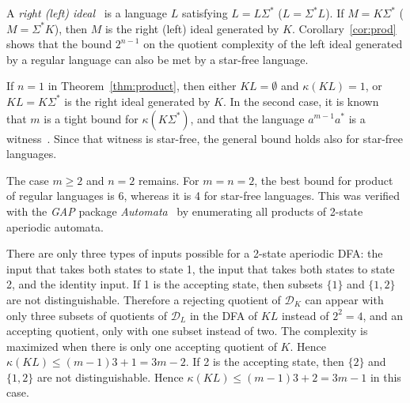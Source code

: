 \documentclass{llncs}
\renewcommand{\le}{\leqslant}
\renewcommand{\ge}{\geqslant}
\newcommand{\emp}{\emptyset}
\newcommand{\Sig}{\Sigma}
\newcommand{\cD}{{\mathcal D}}
\begin{document}
A \emph{right (left) ideal}~\cite{BJL10} is a language $L$ satisfying $L=L\Sig^*$ ($L=\Sig^*L$). 
If $M=K\Sig^*$ ($M=\Sig^*K$), then $M$ is the right (left) ideal generated by $K$.
Corollary~\ref{cor:prod} shows that  the bound $2^{n-1}$ on the quotient complexity of the left ideal generated by a regular language can also be met by a star-free language.

If $n=1$ in Theorem~\ref{thm:product}, then either $KL=\emp$ and $\kappa(KL)=1$, or $KL=K\Sig^*$ is the right ideal generated by $K$. In the second case, it is known~\cite{YZS94} that $m$ is a tight bound for $\kappa(K\Sig^*)$, and that the language $a^{m-1}a^*$ is a witness~\cite{BJL10}. Since that witness is star-free, the general bound holds also for star-free languages.

The case $m\ge 2 $ and $n=2$ remains. 
For $m=n=2$, the best bound for product of  regular languages is 6, whereas it is 4 for star-free languages. This was verified with the \emph{GAP} package \emph{Automata}~\cite{GAP} by enumerating all products of 2-state aperiodic automata.

There are only three types of inputs possible for a 2-state aperiodic DFA:
the input that takes both states to state 1, the input that takes both states to state 2, and the identity input.
If 1 is the accepting state, then subsets $\{1\}$ and $\{1,2\}$ are not distinguishable.
Therefore a rejecting quotient  of $\cD_K$ can appear with only three subsets of quotients of $\cD_L$ in the DFA of $KL$ instead of $2^2=4$,  and an accepting quotient, only with one subset instead of two.
The complexity is maximized when there is only one accepting quotient of $K$. Hence $\kappa(KL)\le (m-1)3+1=3m-2$. 
If 2 is the accepting state, then  $\{2\}$ and $\{1,2\}$ are not distinguishable.
Hence $\kappa(KL)\le (m-1)3+2=3m-1$ in this case.
\end{document}
